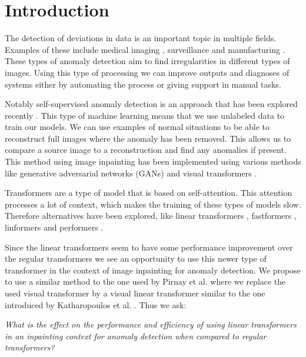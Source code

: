 \chapter{Introduction}\label{ch:introduction}

The detection of deviations in data is an important topic in multiple fields. Examples of these include medical imaging \cite{han_madgan_2021}, surveillance \cite{shashikar_traffic_2017} and manufacturing \cite{susto_anomaly_2017}. These types of anomaly detection aim to find irregularities in different types of images. Using this type of processing we can improve outputs and diagnoses of systems either by automating the process or giving support in manual tasks.

Notably self-supervised anomaly detection is an approach that has been explored recently \cite{li_cutpaste_2021, ali_self-supervised_2020}. This type of machine learning means that we use unlabeled data to train our models. We can use examples of normal situations to be able to reconstruct full images where the anomaly has been removed. This allows us to compare a source image to a reconstruction and find any anomalies if present. This method using image inpainting has been implemented using various methods like generative adversarial networks (GANs) \cite{yeh_semantic_2017} and visual transformers \cite{pirnay_inpainting_2021}.

Transformers \cite{vaswani_attention_2017} are a type of model that is based on self-attention. This attention processes a lot of context, which makes the training of these types of models slow. Therefore alternatives have been explored, like linear transformers \cite{katharopoulos_transformers_2020}, fastformers \cite{wu_fastformer_2021}, linformers \cite{wang_linformer_2020} and performers \cite{choromanski_rethinking_2020}.

Since the linear transformers seem to have some performance improvement over the regular transformers we see an opportunity to use this newer type of transformer in the context of image inpainting for anomaly detection. We propose to use a similar method to the one used by Pirnay et al. \cite{pirnay_inpainting_2021} where we replace the used visual transformer by a visual linear transformer similar to the one introduced by Katharopoulos et al. \cite{katharopoulos_transformers_2020}. Thus we ask:

\textsl{What is the effect on the performance and efficiency of using linear transformers in an inpainting context for anomaly detection when compared to regular transformers?}


